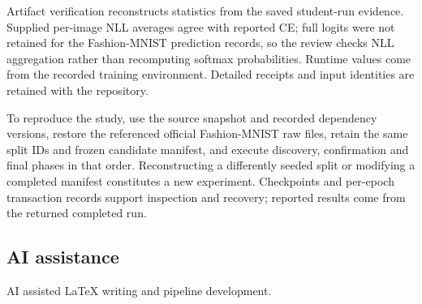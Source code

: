 Artifact verification reconstructs statistics from the saved student-run evidence. Supplied per-image NLL averages agree with reported CE; full logits were not retained for the Fashion-MNIST prediction records, so the review checks NLL aggregation rather than recomputing softmax probabilities. Runtime values come from the recorded training environment. Detailed receipts and input identities are retained with the repository.

To reproduce the study, use the source snapshot and recorded dependency versions, restore the referenced official Fashion-MNIST raw files, retain the same split IDs and frozen candidate manifest, and execute discovery, confirmation and final phases in that order. Reconstructing a differently seeded split or modifying a completed manifest constitutes a new experiment. Checkpoints and per-epoch transaction records support inspection and recovery; reported results come from the returned completed run.

\subsection{AI assistance}
AI assisted LaTeX writing and pipeline development.

